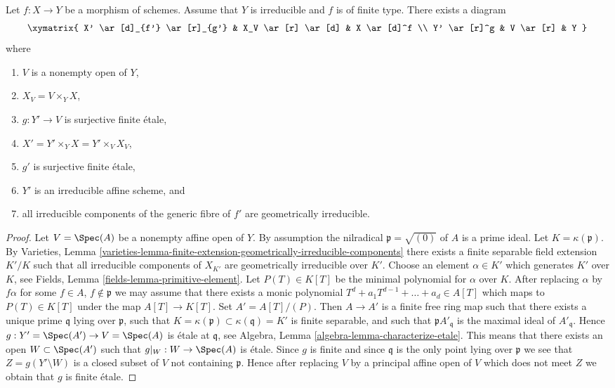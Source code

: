 \begin{lemma}
\label{lemma-make-components-generic-fibre-geometrically-irreducible}
Let $f : X \to Y$ be a morphism of schemes.
Assume that $Y$ is irreducible and $f$ is of finite type.
There exists a diagram
$$
\xymatrix{
X' \ar[d]_{f'} \ar[r]_{g'} & X_V \ar[r] \ar[d] & X \ar[d]^f \\
Y' \ar[r]^g & V \ar[r] & Y
}
$$
where
\begin{enumerate}
\item $V$ is a nonempty open of $Y$,
\item $X_V = V \times_Y X$,
\item $g : Y' \to V$ is surjective finite \'etale,
\item $X' = Y' \times_Y X = Y' \times_V X_V$,
\item $g'$ is surjective finite \'etale,
\item $Y'$ is an irreducible affine scheme, and
\item all irreducible components of the generic fibre of $f'$
are geometrically irreducible.
\end{enumerate}
\end{lemma}

\begin{proof}
Let $V = \Spec(A)$ be a nonempty affine open of $Y$.
By assumption the nilradical $\mathfrak p = \sqrt{(0)}$ of $A$ is a prime ideal.
Let $K = \kappa(\mathfrak p)$. By
Varieties, Lemma
\ref{varieties-lemma-finite-extension-geometrically-irreducible-components}
there exists a finite separable field extension
$K'/K$ such that all irreducible components of $X_{K'}$ are
geometrically irreducible over $K'$.
Choose an element $\alpha \in K'$ which generates $K'$ over
$K$, see
Fields, Lemma \ref{fields-lemma-primitive-element}.
Let $P(T) \in K[T]$ be the minimal polynomial for $\alpha$ over $K$.
After replacing $\alpha$ by $f \alpha$ for some
$f \in A$, $f \not \in \mathfrak p$
we may assume that there exists a monic polynomial
$T^d + a_1T^{d - 1} + \ldots + a_d \in A[T]$ which maps to
$P(T) \in K[T]$ under the map $A[T] \to K[T]$.
Set $A' = A[T]/(P)$. Then $A \to A'$ is a finite free ring map
such that there exists a unique prime $\mathfrak q$ lying over
$\mathfrak p$, such that
$K = \kappa(\mathfrak p) \subset \kappa(\mathfrak q) = K'$
is finite separable, and such that $\mathfrak pA'_{\mathfrak q}$
is the maximal ideal of $A'_{\mathfrak q}$.
Hence $g : Y' = \Spec(A') \to V = \Spec(A)$
is \'etale at $\mathfrak q$, see
Algebra, Lemma \ref{algebra-lemma-characterize-etale}.
This means that there exists an open $W \subset \Spec(A')$ such
that $g|_W : W \to \Spec(A)$ is \'etale.
Since $g$ is finite and since $\mathfrak q$ is the only point lying over
$\mathfrak p$ we see that $Z = g(Y' \setminus W)$ is a closed subset of $V$
not containing $\mathfrak p$. Hence after replacing $V$ by a principal
affine open of $V$ which does not meet $Z$ we obtain that $g$ is finite
\'etale.
\end{proof}







